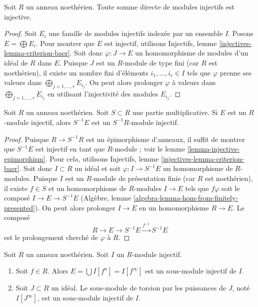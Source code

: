 \begin{lemma}
\label{lemma-sum-injective-modules}
Soit $R$ un anneau noethérien. Toute somme directe de modules injectifs
est injective.
\end{lemma}

\begin{proof}
Soit $E_i$ une famille de modules injectifs indexée par un ensemble $I$.
Posons $E = \bigoplus E_i$. Pour montrer que $E$ est injectif, utilisons
Injectifs, lemme \ref{injectives-lemma-criterion-baer}.
Soit donc $\varphi : J \to E$ un homomorphisme de modules d'un idéal de $R$
dans $E$. Puisque $J$ est un $R$-module de type fini
(car $R$ est noethérien), il existe un nombre fini d'éléments $i_1, \ldots, i_r \in I$
tels que $\varphi$ prenne ses valeurs dans $\bigoplus_{j = 1, \ldots, r} E_{i_j}$.
On peut alors prolonger $\varphi$ à valeurs dans $\bigoplus_{j = 1, \ldots, r} E_{i_j}$
en utilisant l'injectivité des modules $E_{i_j}$.
\end{proof}

\begin{lemma}
\label{lemma-localization-injective-modules}
Soit $R$ un anneau noethérien. Soit $S \subset R$ une partie multiplicative.
Si $E$ est un $R$-module injectif, alors $S^{-1}E$ est un $S^{-1}R$-module injectif.
\end{lemma}

\begin{proof}
Puisque $R \to S^{-1}R$ est un épimorphisme d'anneaux, il suffit de montrer que
$S^{-1}E$ est injectif en tant que $R$-module ; voir le lemme \ref{lemma-injective-epimorphism}.
Pour cela, utilisons Injectifs, lemme \ref{injectives-lemma-criterion-baer}.
Soit donc $I \subset R$ un idéal et soit $\varphi : I \to S^{-1} E$ un homomorphisme de $R$-modules.
Puisque $I$ est un $R$-module de présentation finie
(car $R$ est noethérien), il existe $f \in S$ et un homomorphisme
de $R$-modules $I \to E$ tels que $f\varphi$ soit le composé $I \to E \to S^{-1}E$
(Algèbre, lemme \ref{algebra-lemma-hom-from-finitely-presented}).
On peut alors prolonger $I \to E$ en un homomorphisme $R \to E$.
Le composé
$$
R \to E \to S^{-1}E \xrightarrow{f^{-1}} S^{-1}E
$$
est le prolongement cherché de $\varphi$ à $R$.
\end{proof}

\begin{lemma}
\label{lemma-injective-module-divide}
Soit $R$ un anneau noethérien. Soit $I$ un $R$-module injectif.
\begin{enumerate}
\item Soit $f \in R$. Alors $E = \bigcup I[f^n] = I[f^\infty]$
est un sous-module injectif de $I$.
\item Soit $J \subset R$ un idéal. Le sous-module de torsion
par les puissances de $J$, noté $I[J^\infty]$, est un sous-module injectif de $I$.
\end{enumerate}
\end{lemma}

